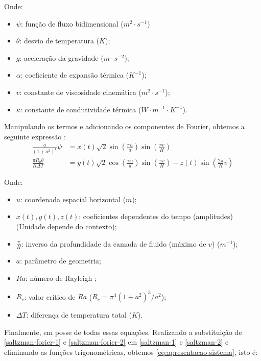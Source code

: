 \documentclass[12pt, a4paper]{article}
\begin{document}
    Onde:
    \begin{itemize}
        \item $\psi$: função de fluxo bidimensional ($m^2 \cdot s^{-1}$)
        \item $\theta$: desvio de temperatura ($K$);
        \item $g$: aceleração da gravidade ($m \cdot s^{-2}$);
        \item $\alpha$: coeficiente de expansão térmica ($K^{-1}$);
        \item $v$: constante de viscosidade cinemática ($m^2 \cdot s^{-1}$);
        \item $\kappa$: constante de condutividade térmica ($W \cdot m^{-1}
                  \cdot K^{-1}$).
    \end{itemize}
    
    Manipulando os termos e adicionando os componentes de Fourier, obtemos a
    seguinte expressão \cite{peitgen2013} \cite{Saltzman1962}:
    \begin{align}
        \frac{a}{(1 + a^2)^k} \psi        & = x(t)\sqrt{2} \sin \left(\frac{\pi
        u}{a}\right) \sin \left(\frac{\pi v}{H}\right) \label{saltzman-forier-1} \\
        \frac{\pi R_o \theta}{R \Delta T} & = y(t)\sqrt{2} \cos \left(\frac{\pi
            u}{a}\right) \sin \left(\frac{\pi v}{H}\right)
        \label{saltzman-forier-2} - z(t)
        \sin \left(\frac{2\pi}{H}v\right)
    \end{align}
    
    Onde:
    \begin{itemize}
        \item $u$: coordenada espacial horizontal ($m$);
        \item $x(t), y(t), z(t)$: coeficientes dependentes do tempo
              (amplitudes) (Unidade depende do contexto);
        \item $\frac{\pi}{H}$: inverso da profundidade da camada de fluido
              (máximo de $v$) ($m^{-1}$);
        \item $a$: parâmetro de geometria;
        \item $Ra$: número de Rayleigh \cite{Rayleigh1916};
        \item $R_c$: valor crítico de $Ra$ ($R_c = \pi^4(1 + a^2)^3/a^2$);
        \item $\Delta T$: diferença de temperatura total ($K$).
    \end{itemize}
    
    Finalmente, em posse de todas essas equações. Realizando a substituição de
    \ref{saltzman-forier-1} e \ref{saltzman-forier-2} em \ref{saltzman-1} e
    \ref{saltzman-2} e eliminando as funções trigonométricas, obtemos
    \ref{eq:apresentacao-sistema}, isto é:
    
\end{document}
